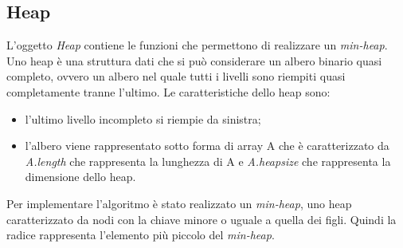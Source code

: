 
\subsection{Heap}
\label{heap}

L'oggetto \textit{Heap} contiene le funzioni che permettono di realizzare un \textit{min-heap}. Uno heap è una struttura dati che si può considerare un albero binario quasi completo, ovvero un albero nel quale tutti i livelli sono riempiti quasi completamente tranne l'ultimo. Le caratteristiche dello heap sono:

\begin{itemize}
    \item l'ultimo livello incompleto si riempie da sinistra;
    \item l'albero viene rappresentato sotto forma di array A che è caratterizzato da \textit{A.length} che rappresenta la lunghezza di A e \textit{A.heapsize} che rappresenta la dimensione dello heap.
\end{itemize}


Per implementare l'algoritmo è stato realizzato un \textit{min-heap}, uno heap caratterizzato da nodi con la chiave minore o uguale a quella dei figli. Quindi la radice rappresenta l'elemento più piccolo del \textit{min-heap}.


